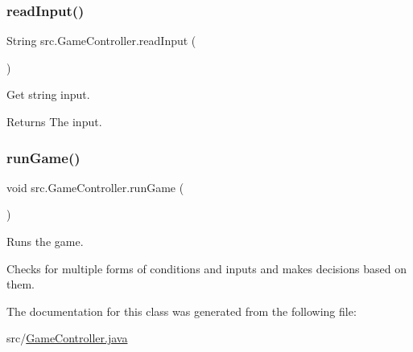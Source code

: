 \subsubsection{\texorpdfstring{read\+Input()}{readInput()}}
{\footnotesize\ttfamily String src.\+Game\+Controller.\+read\+Input (\begin{DoxyParamCaption}{ }\end{DoxyParamCaption})}



Get string input. 

\begin{DoxyReturn}{Returns}
The input. 
\end{DoxyReturn}
\mbox{\label{classsrc_1_1GameController_ac77f1748a5500f840a22824b9c774f1d}} 
\subsubsection{\texorpdfstring{run\+Game()}{runGame()}}
{\footnotesize\ttfamily void src.\+Game\+Controller.\+run\+Game (\begin{DoxyParamCaption}{ }\end{DoxyParamCaption})}



Runs the game. 

Checks for multiple forms of conditions and inputs and makes decisions based on them. 

The documentation for this class was generated from the following file\+:\begin{DoxyCompactItemize}
\item 
src/\hyperlink{GameController_8java}{Game\+Controller.\+java}\end{DoxyCompactItemize}
